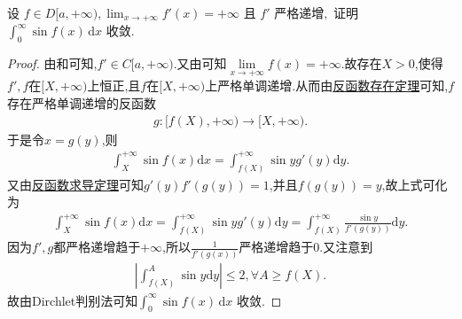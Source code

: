 \documentclass[../../main.tex]{subfiles}
\begin{document}
\begin{example}
设
\(
f \in D[a, +\infty), \lim_{x \to +\infty} f'(x) = +\infty \text{ 且 } f' \text{ 严格递增},
\)
证明 \(\int_{0}^{\infty} \sin f(x) \, \mathrm{d}x\) 收敛.
\end{example}
\begin{proof}
由和可知,$f'\in C[a,+\infty)$.又由可知$\underset{x\rightarrow +\infty}{\lim}f\left( x \right) =+\infty$.故存在$X>0$,使得$f',f$在$[X,+\infty)$上恒正,且$f$在$[X,+\infty)$上严格单调递增.从而由\hyperref[theorem:反函数存在定理]{反函数存在定理}可知,$f$存在严格单调递增的反函数
\begin{align*}
g:[f(X),+\infty)\to [X,+\infty).
\end{align*}
于是令$x=g(y)$,则
\begin{align*}
\int_X^{+\infty}{\sin f\left( x \right) \mathrm{d}x}=\int_{f\left( X \right)}^{+\infty}{\sin y}g'\left( y \right) \mathrm{d}y.
\end{align*}
又由\hyperref[theorem:反函数求导定理]{反函数求导定理}可知$g'(y)f'(g(y))=1$,并且$f(g(y))=y$,故上式可化为
\begin{align*}
\int_X^{+\infty}{\sin f\left( x \right) \mathrm{d}x}=\int_{f\left( X \right)}^{+\infty}{\sin y}g' \left( y \right) \mathrm{d}y=\int_{f\left( X \right)}^{+\infty}{\frac{\sin y}{f'\left( g\left( y \right) \right)}}\mathrm{d}y.
\end{align*}
因为$f',g$都严格递增趋于$+\infty$,所以$\frac{1}{f'(g(x))}$严格递增趋于0.又注意到
\begin{align*}
\left| \int_{f\left( X \right)}^A{\sin y}\mathrm{d}y \right|\leqslant 2,\forall A\geqslant f\left( X \right) .
\end{align*}
故由Dirchlet判别法可知\(\int_{0}^{\infty} \sin f(x) \, \mathrm{d}x\) 收敛.
\end{proof}
\end{document}
